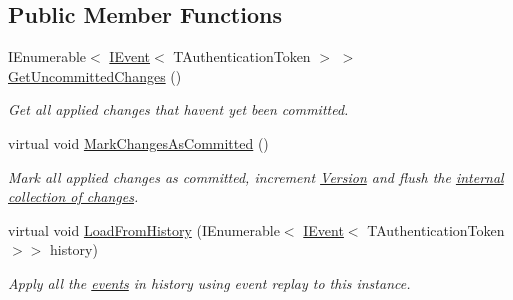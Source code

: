 \subsection*{Public Member Functions}
\begin{DoxyCompactItemize}
\item 
I\+Enumerable$<$ \hyperlink{interfaceCqrs_1_1Events_1_1IEvent}{I\+Event}$<$ T\+Authentication\+Token $>$ $>$ \hyperlink{classCqrs_1_1Domain_1_1AggregateRoot_a625e885ec7885a686f729ed1efe3a8fa_a625e885ec7885a686f729ed1efe3a8fa}{Get\+Uncommitted\+Changes} ()
\begin{DoxyCompactList}\small\item\em Get all applied changes that haven\textquotesingle{}t yet been committed. \end{DoxyCompactList}\item 
virtual void \hyperlink{classCqrs_1_1Domain_1_1AggregateRoot_adab968b830e186cb832583910bf6f3a6_adab968b830e186cb832583910bf6f3a6}{Mark\+Changes\+As\+Committed} ()
\begin{DoxyCompactList}\small\item\em Mark all applied changes as committed, increment \hyperlink{classCqrs_1_1Domain_1_1AggregateRoot_a15f351663975c1d8e2cdc37b8c4d970f_a15f351663975c1d8e2cdc37b8c4d970f}{Version} and flush the \hyperlink{}{internal collection of changes}. \end{DoxyCompactList}\item 
virtual void \hyperlink{classCqrs_1_1Domain_1_1AggregateRoot_aec873ad6e4c98309cad2d9f1c534aebb_aec873ad6e4c98309cad2d9f1c534aebb}{Load\+From\+History} (I\+Enumerable$<$ \hyperlink{interfaceCqrs_1_1Events_1_1IEvent}{I\+Event}$<$ T\+Authentication\+Token $>$$>$ history)
\begin{DoxyCompactList}\small\item\em Apply all the \hyperlink{}{events} in {\itshape history}  using event replay to this instance. \end{DoxyCompactList}\end{DoxyCompactItemize}
